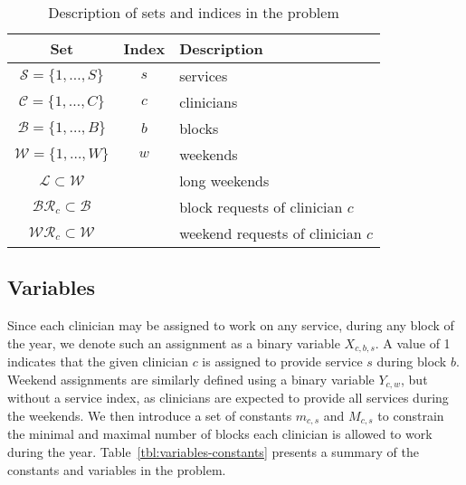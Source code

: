 \begin{table}[h]
	\centering
  \caption{Description of sets and indices in the problem}%
  \label{tbl:sets-indices}
	\begin{tabular}{ c c l }
		\toprule
		\textbf{Set}                         & \textbf{Index} & \textbf{Description}  
		\\ \midrule
		$\mathcal{S} = \{1, \ldots, S \}$    & $s$            & services              
		\\
		$\mathcal{C} = \{1, \ldots, C \}$    & $c$            & clinicians            
		\\
		$\mathcal{B} = \{1, \ldots, B \}$    & $b$            & blocks                
		\\
		$\mathcal{W} = \{1, \ldots, W \}$    & $w$            & weekends              
		\\
		$\mathcal{L} \subset \mathcal{W}$    &                & long weekends         
		\\
		$\mathcal{BR}_c \subset \mathcal{B}$ &                & block requests of
		clinician $c$   \\
		$\mathcal{WR}_c \subset \mathcal{W}$ &                & weekend requests of
		clinician $c$ \\
    \bottomrule
	\end{tabular}
	
\end{table}

\subsection{Variables}\label{sec:meth-variables}
Since each clinician may be assigned to work on any service, during any block of
the year, we denote such an assignment as a binary variable $X_{c, b, s}$. A
value of 1 indicates that the given clinician $c$ is assigned to provide service
$s$ during block $b$. Weekend assignments are similarly defined using a binary
variable $Y_{c, w}$, but without a service index, as clinicians are expected to
provide all services during the weekends. We then introduce a set of constants
$m_{c, s}$ and $M_{c, s}$ to constrain the minimal and maximal number of blocks
each clinician is allowed to work during the year. Table~\ref{tbl:variables-constants} presents a summary of the constants and variables
in the problem.

